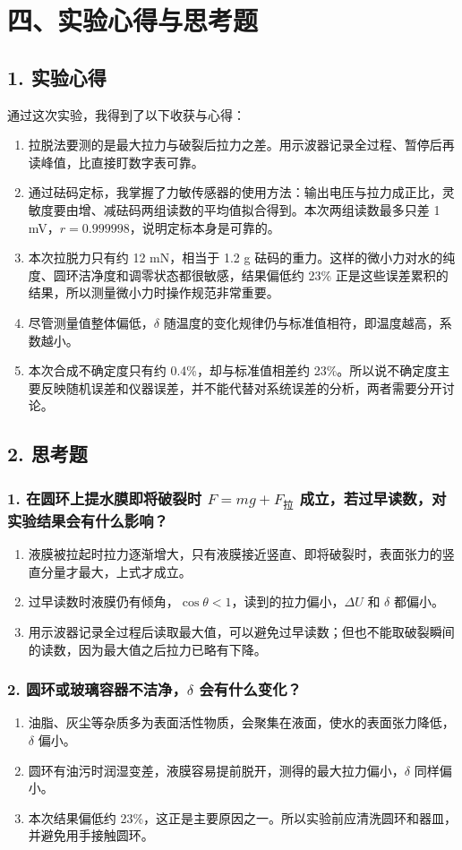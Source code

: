 \clearpage
\section*{四、实验心得与思考题}

\subsection*{1. 实验心得}

通过这次实验，我得到了以下收获与心得：

\begin{enumerate}
\item 拉脱法要测的是最大拉力与破裂后拉力之差。用示波器记录全过程、暂停后再读峰值，比直接盯数字表可靠。
\item 通过砝码定标，我掌握了力敏传感器的使用方法：输出电压与拉力成正比，灵敏度要由增、减砝码两组读数的平均值拟合得到。本次两组读数最多只差 1 mV，$r=0.999998$，说明定标本身是可靠的。
\item 本次拉脱力只有约 12 mN，相当于 1.2 g 砝码的重力。这样的微小力对水的纯度、圆环洁净度和调零状态都很敏感，结果偏低约 23\% 正是这些误差累积的结果，所以测量微小力时操作规范非常重要。
\item 尽管测量值整体偏低，$\delta$ 随温度的变化规律仍与标准值相符，即温度越高，系数越小。
\item 本次合成不确定度只有约 0.4\%，却与标准值相差约 23\%。所以说不确定度主要反映随机误差和仪器误差，并不能代替对系统误差的分析，两者需要分开讨论。

\end{enumerate}
\subsection*{2. 思考题}

\subsubsection*{1. 在圆环上提水膜即将破裂时 $F=mg+F_{\text{拉}}$ 成立，若过早读数，对实验结果会有什么影响？}

\begin{enumerate}
\item 液膜被拉起时拉力逐渐增大，只有液膜接近竖直、即将破裂时，表面张力的竖直分量才最大，上式才成立。
\item 过早读数时液膜仍有倾角，$\cos\theta<1$，读到的拉力偏小，$\Delta U$ 和 $\delta$ 都偏小。
\item 用示波器记录全过程后读取最大值，可以避免过早读数；但也不能取破裂瞬间的读数，因为最大值之后拉力已略有下降。

\end{enumerate}
\subsubsection*{2. 圆环或玻璃容器不洁净，$\delta$ 会有什么变化？}

\begin{enumerate}
\item 油脂、灰尘等杂质多为表面活性物质，会聚集在液面，使水的表面张力降低，$\delta$ 偏小。
\item 圆环有油污时润湿变差，液膜容易提前脱开，测得的最大拉力偏小，$\delta$ 同样偏小。
\item 本次结果偏低约 23\%，这正是主要原因之一。所以实验前应清洗圆环和器皿，并避免用手接触圆环。
\end{enumerate}
